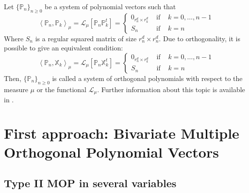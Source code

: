 \documentclass[12pt,a4]{report}
\theoremstyle{plain}
\newcommand{\prodesc}[2]{\left\langle #1 , #2 \right\rangle}
\begin{document}
Let $\{\mathbb{P}_n\}_{n\geq 0}$ be a system of polynomial vectors such that
$$
\prodesc{\mathbb P_n}{\mathbb P_k}_\mu = \mathcal{L}_\mu[\mathbb P_n \mathbb P_k^t]= \left\{\begin{array}{ccl}
    0_{r_n^d\times r_k^d} &   \text{ if } & k=0,\dots,n-1 \\
    S_n & \text{ if } & k=n      
\end{array}\right. 
$$
Where $S_n$ is a regular squared matrix of size $r_n^d\times r_n^d$.
Due to orthogonality, it is possible to give an equivalent condition:
\begin{equation}
    \label{eq:prodesc-matrix-PX}
    \prodesc{\mathbb P_n}{\mathbb X_k}_\mu = \mathcal{L}_\mu[\mathbb P_n \mathbb X_k^t]= \left\{\begin{array}{ccl}
        0_{r_n^d\times r_k^d} &   \text{ if } & k=0,\dots,n-1 \\
        S_n & \text{ if } & k=n      
    \end{array}\right. 
\end{equation}
Then, $\{\mathbb{P}_n\}_{n\geq 0}$ is called a system of orthogonal polynomials with respect to the measure $\mu$ or the functional $\mathcal L_\mu$. Further information about this topic is available in \cite[Ch. III, Section 3.2]{dunkl_xu_2014}.

\chapter{First approach: Bivariate Multiple Orthogonal Polynomial Vectors}

\section{Type II MOP in several variables}
\end{document}
